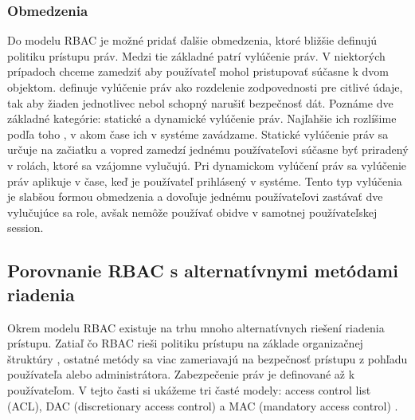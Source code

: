 \subsubsection{Obmedzenia}
Do modelu RBAC je možné pridať ďalšie obmedzenia, ktoré bližšie definujú politiku prístupu práv. Medzi tie základné patrí vylúčenie práv. V niektorých prípadoch chceme zamedziť aby používateľ mohol pristupovať súčasne k dvom objektom. \cite{telecom} definuje vylúčenie práv ako rozdelenie zodpovednosti pre citlivé údaje, tak aby žiaden jednotlivec nebol schopný narušiť bezpečnosť dát. Poznáme dve základné kategórie: statické a dynamické vylúčenie práv. Najľahšie ich rozlíšime podľa toho , v akom čase ich v systéme zavádzame. Statické vylúčenie práv sa určuje na začiatku a vopred zamedzí jednému používateľovi súčasne byť priradený v rolách, ktoré sa vzájomne vylučujú. Pri dynamickom vylúčení práv sa vylúčenie práv aplikuje v čase, keď je používateľ prihlásený v systéme. Tento typ vylúčenia je slabšou formou obmedzenia a dovoľuje jednému používateľovi zastávať dve vylučujúce sa role, avšak nemôže používať obidve v samotnej používateľskej session.



\subsection{Porovnanie RBAC s alternatívnymi metódami riadenia}
Okrem modelu RBAC existuje na trhu mnoho alternatívnych riešení riadenia prístupu. Zatiaľ čo RBAC rieši politiku prístupu na základe organizačnej štruktúry , ostatné metódy sa viac zameriavajú na bezpečnosť prístupu z pohľadu používateľa alebo administrátora. Zabezpečenie práv je definované až k používateľom.
V tejto časti si ukážeme tri časté modely: access control list (ACL), DAC (discretionary access control) a MAC (mandatory access control) .

